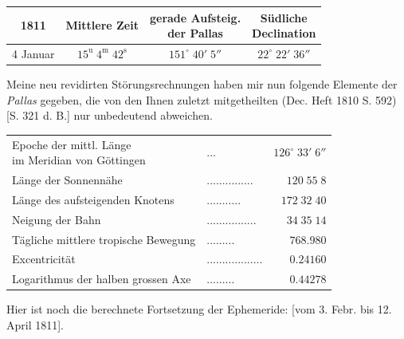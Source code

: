 \begin{center}\fontsize{10}{12}\selectfont\setlength{\tabcolsep}{4pt}\renewcommand{\arraystretch}{1.15}\begin{tabular}{c|c|c|c}
1811 & Mittlere Zeit & \shortstack{gerade Aufsteig.\\der Pallas} & \shortstack{Südliche\\Declination}\\\hline
4 Januar & $15^{\text{u}}\;4^{\text{m}}\;42^{\text{s}}$ & $151^\circ\;40'\;5''$ & $22^\circ\;22'\;36''$\\
\end{tabular}\end{center}

\par\indent Meine neu revidirten Störungsrechnungen haben mir nun folgende Elemente der \emph{Pallas} gegeben, die von den Ihnen zuletzt mitgetheilten (Dec. Heft 1810 S. 592) [S. 321 d. B.] nur unbedeutend abweichen.

\begin{center}\fontsize{10}{12}\selectfont\setlength{\tabcolsep}{4pt}\renewcommand{\arraystretch}{1.15}\begin{tabular}{llr}
\shortstack[l]{Epoche der mittl. Länge\\im Meridian von Göttingen} & .\;.\;. & $126^\circ\;33'\;6''$\\
Länge der Sonnennähe & .\;.\;.\;.\;.\;.\;.\;.\;.\;.\;.\;.\;.\;.\;. & $120\;55\;8$\\
Länge des aufsteigenden Knotens & .\;.\;.\;.\;.\;.\;.\;.\;.\;.\;. & $172\;32\;40$\\
Neigung der Bahn & .\;.\;.\;.\;.\;.\;.\;.\;.\;.\;.\;.\;.\;.\;.\;. & $34\;35\;14$\\
Tägliche mittlere tropische Bewegung & .\;.\;.\;.\;.\;.\;.\;.\;. & $768.980$\\
Excentricität & .\;.\;.\;.\;.\;.\;.\;.\;.\;.\;.\;.\;.\;.\;.\;.\;.\;. & $0.24160$\\
Logarithmus der halben grossen Axe & .\;.\;.\;.\;.\;.\;.\;.\;. & $0.44278$\\
\end{tabular}\end{center}

\par\indent Hier ist noch die berechnete Fortsetzung der Ephemeride: [vom 3. Febr. bis 12. April 1811].
